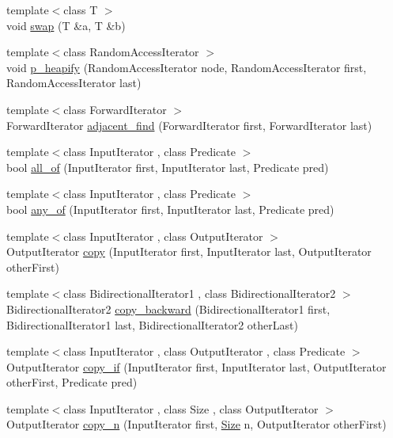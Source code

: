 \begin{DoxyCompactItemize}
\item 
{\footnotesize template$<$class T $>$ }\\void \hyperlink{namespaceprism_a6430516ab4f2e2a7f43323acb6b559d8}{swap} (T \&a, T \&b)
\item 
{\footnotesize template$<$class Random\+Access\+Iterator $>$ }\\void \hyperlink{namespaceprism_a5f2c83ae0d89a6581d1c42ba6fd79de0}{p\+\_\+heapify} (Random\+Access\+Iterator node, Random\+Access\+Iterator first, Random\+Access\+Iterator last)
\item 
{\footnotesize template$<$class Forward\+Iterator $>$ }\\Forward\+Iterator \hyperlink{namespaceprism_a82052418345794a13044c15d8e32dd89}{adjacent\+\_\+find} (Forward\+Iterator first, Forward\+Iterator last)
\item 
{\footnotesize template$<$class Input\+Iterator , class Predicate $>$ }\\bool \hyperlink{namespaceprism_aba366b328f3b6161e6115c16b7153c6d}{all\+\_\+of} (Input\+Iterator first, Input\+Iterator last, Predicate pred)
\item 
{\footnotesize template$<$class Input\+Iterator , class Predicate $>$ }\\bool \hyperlink{namespaceprism_a5d0e3ddb9f698759635572f1220ec0ca}{any\+\_\+of} (Input\+Iterator first, Input\+Iterator last, Predicate pred)
\item 
{\footnotesize template$<$class Input\+Iterator , class Output\+Iterator $>$ }\\Output\+Iterator \hyperlink{namespaceprism_ae776f4cd825f79e7af1cf6ee1d90a209}{copy} (Input\+Iterator first, Input\+Iterator last, Output\+Iterator other\+First)
\item 
{\footnotesize template$<$class Bidirectional\+Iterator1 , class Bidirectional\+Iterator2 $>$ }\\Bidirectional\+Iterator2 \hyperlink{namespaceprism_a2564c63b76369cc81ff725a56e818046}{copy\+\_\+backward} (Bidirectional\+Iterator1 first, Bidirectional\+Iterator1 last, Bidirectional\+Iterator2 other\+Last)
\item 
{\footnotesize template$<$class Input\+Iterator , class Output\+Iterator , class Predicate $>$ }\\Output\+Iterator \hyperlink{namespaceprism_afbed55ae6769c2d88c125aedc2f3846e}{copy\+\_\+if} (Input\+Iterator first, Input\+Iterator last, Output\+Iterator other\+First, Predicate pred)
\item 
{\footnotesize template$<$class Input\+Iterator , class Size , class Output\+Iterator $>$ }\\Output\+Iterator \hyperlink{namespaceprism_af907f3f5637d4ec056e9b833b6272953}{copy\+\_\+n} (Input\+Iterator first, \hyperlink{classprism_1_1_size}{Size} n, Output\+Iterator other\+First)

\end{DoxyCompactItemize}
